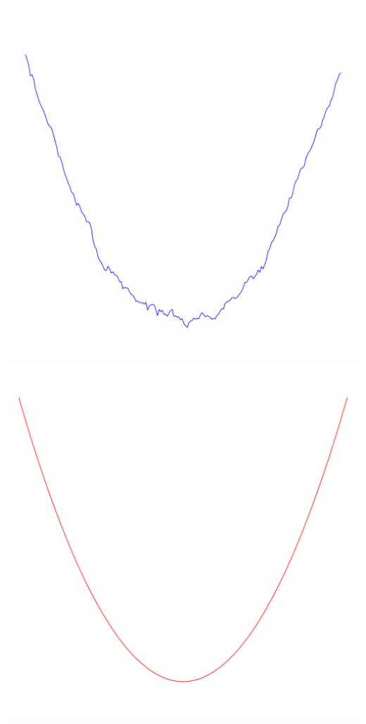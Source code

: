 \documentclass[12pt]{beamer}
\begin{document}
\begin{frame}
\begin{center}
{	\includegraphics[height=0.3\textheight]{../media/processed/moving_average}%
	\includegraphics[height=0.3\textheight]{../media/processed/trend}%
}%
\end{center}
\end{frame}
\end{document}
